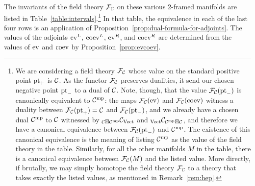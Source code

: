 \documentclass{amsart}
\begin{document}
The invariants of the field theory $\mathcal F_\mathcal C$ on these various 2-framed manifolds are listed in Table~\ref{table:intervals}.\footnote{We are considering a field theory $\mathcal F_\mathcal C$ whose value on the standard positive point $\mathrm{pt}_+$ is $\mathcal C$.  As the functor $\mathcal F_\mathcal C$ preserves dualities, it send our chosen negative point $\mathrm{pt}_-$ to a dual of $\mathcal C$.  Note, though, that the value $\mathcal F_\mathcal C(\mathrm{pt}_-)$ is canonically equivalent to $\mathcal C^{\mathrm{mp}}$: the maps $\mathcal F_\mathcal C(\mathrm{ev})$ and $\mathcal F_\mathcal C(\mathrm{coev})$ witness a duality between $\mathcal F_\mathcal C(\mathrm{pt}_+) = \mathcal C$ and $\mathcal F_\mathcal C(\mathrm{pt}_-)$, and we already have a chosen dual $\mathcal C^{\mathrm{mp}}$ to $\mathcal C$ witnessed by ${}_{\mathcal C \boxtimes \mathcal C^{\mathrm{mp}}} \mathcal C_{\mathrm{Vect}}$ and ${}_{\mathrm{Vect}} \mathcal C_{\mathcal C^{\mathrm{mp}} \boxtimes \mathcal C}$, and therefore we have a canonical equivalence between $\mathcal F_\mathcal C(\mathrm{pt}_-)$ and $\mathcal C^{\mathrm{mp}}$.  The existence of this canonical equivalence is the meaning of listing $\mathcal C^{\mathrm{mp}}$ as the value of the field theory in the table.  Similarly, for all the other manifolds $M$ in the table, there is a canonical equivalence between $\mathcal F_\mathcal C(M)$ and the listed value.  More directly, if brutally, we may simply homotope the field theory $\mathcal F_\mathcal C$ to a theory that takes exactly the listed values, as mentioned in Remark~\ref{rem:hep}.}  In that table, the equivalence in each of the last four rows is an application of Proposition~\ref{prop:dual-formula-for-adjoints}.  The values of the adjoints $\mathrm{ev}^L$, $\mathrm{coev}^L$, $\mathrm{ev}^R$, and $\mathrm{coev}^R$ are determined from the values of $\mathrm{ev}$ and $\mathrm{coev}$ by Proposition~\ref{prop:evcoev}.
\end{document}
